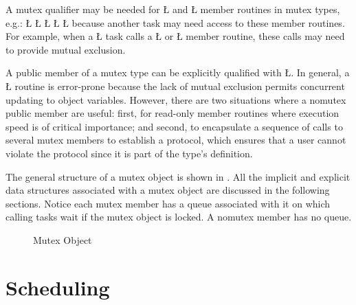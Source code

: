 \documentclass[openright,twoside]{report}
\begin{document}
A mutex qualifier may be needed for \LGinlinetrue\LGbegin\lgrinde\L{}\endlgrinde\LGend{} and \LGinlinetrue\LGbegin\lgrinde\L{}\endlgrinde\LGend{} member routines in mutex types, e.g.:
\LGinlinefalse\LGbegin\lgrinde
\L{}
\L{}
\L{\LB{}}
\CE{}\L{\LB{}}
\L{\LB{\};}}
\endlgrinde\LGend
because another task may need access to these member routines.
For example, when a \LGinlinetrue\LGbegin\lgrinde\L{}\endlgrinde\LGend{} task calls a \LGinlinetrue\LGbegin\lgrinde\L{}\endlgrinde\LGend{} or \LGinlinetrue\LGbegin\lgrinde\L{}\endlgrinde\LGend{} member routine, these calls may need to provide mutual exclusion.

A public member of a mutex type can be explicitly qualified with \LGinlinetrue\LGbegin\lgrinde\L{}\endlgrinde\LGend{}.
In general, a \LGinlinetrue\LGbegin\lgrinde\L{}\endlgrinde\LGend{} routine is error-prone because the lack of mutual exclusion permits concurrent updating to object variables.
However, there are two situations where a nomutex public member are useful:
first, for read-only member routines where execution speed is of critical importance;
and second, to encapsulate a sequence of calls to several mutex members to establish a protocol, which ensures that a user cannot violate the protocol since it is part of the type's definition.

The general structure of a mutex object is shown in .
All the implicit and explicit data structures associated with a mutex object are discussed in the following sections.
Notice each mutex member has a queue associated with it on which calling tasks wait if the mutex object is locked.
A nomutex member has no queue.

\begin{figure}
\centering

\caption{\uC Mutex Object}
\label{f:uC++MutexObject}
\end{figure}


\section{Scheduling}
\end{document}
